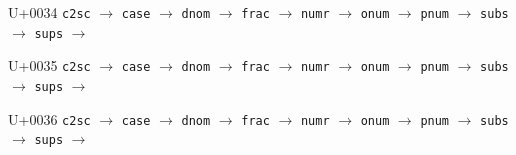 \documentclass{article}
\begin{document}
\begin{substitutions}
\goodbreak

U+0034  \linebreak
    \texttt{c2sc} $\to$  \linebreak
    \texttt{case} $\to$  \linebreak
    \texttt{dnom} $\to$  \linebreak
    \texttt{frac} $\to$  \linebreak
    \texttt{numr} $\to$  \linebreak
    \texttt{onum} $\to$  \linebreak
    \texttt{pnum} $\to$  \linebreak
    \texttt{subs} $\to$  \linebreak
    \texttt{sups} $\to$  

\goodbreak

U+0035  \linebreak
    \texttt{c2sc} $\to$  \linebreak
    \texttt{case} $\to$  \linebreak
    \texttt{dnom} $\to$  \linebreak
    \texttt{frac} $\to$  \linebreak
    \texttt{numr} $\to$  \linebreak
    \texttt{onum} $\to$  \linebreak
    \texttt{pnum} $\to$  \linebreak
    \texttt{subs} $\to$  \linebreak
    \texttt{sups} $\to$  

\goodbreak

U+0036  \linebreak
    \texttt{c2sc} $\to$  \linebreak
    \texttt{case} $\to$  \linebreak
    \texttt{dnom} $\to$  \linebreak
    \texttt{frac} $\to$  \linebreak
    \texttt{numr} $\to$  \linebreak
    \texttt{onum} $\to$  \linebreak
    \texttt{pnum} $\to$  \linebreak
    \texttt{subs} $\to$  \linebreak
    \texttt{sups} $\to$  


\end{substitutions}
\end{document}
